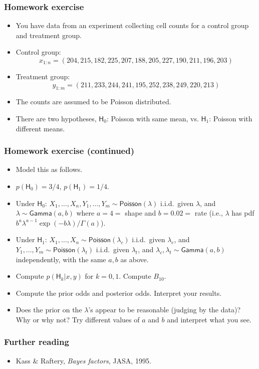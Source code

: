 \documentclass[handout]{beamer}
\def\H{\textsf{H}}
\begin{document}
\begin{frame}
\frametitle{Homework exercise}
\begin{itemize}
\item You have data from an experiment collecting cell counts for a control group and treatment group.
\item Control group:
$$ x_{1:n} = (204,  215, 182,  225,  207,   188,  205,  227,  190,  211, 196,  203) $$
\item Treatment group:
$$ y_{1:m} = (211, 233, 244,  241,  195,  252,  238,  249,  220,  213)$$
\item The counts are assumed to be Poisson distributed.  
\item There are two hypotheses, $\H_0$: Poisson with same mean, vs. $\H_1$: Poisson with different means.
\end{itemize}
\end{frame}


\begin{frame}
\frametitle{Homework exercise (continued)}
\begin{itemize}
\item Model this as follows.
\item $p(\H_0) = 3/4$, $p(\H_1) = 1/4$. 
\item Under $\H_0$: $X_1,\dotsc,X_n,Y_1,\dotsc,Y_m\sim \mathsf{Poisson}(\lambda)$ i.i.d.\ given $\lambda$, and $\lambda\sim\mathsf{Gamma}(a,b)$ where $a=4=$ shape and $b=0.02=$ rate (i.e., $\lambda$ has pdf $b^a\lambda^{a-1}\exp(-b\lambda)/\Gamma(a)$).
\item Under $\H_1$: $X_1,\dotsc,X_n\sim \mathsf{Poisson}(\lambda_c)$ i.i.d.\ given $\lambda_c$, and $Y_1,\dotsc,Y_m\sim \mathsf{Poisson}(\lambda_t)$ i.i.d.\ given $\lambda_t$, and $\lambda_c,\lambda_t\sim\mathsf{Gamma}(a,b)$ independently, with the same $a,b$ as above.
\item Compute $p(\H_k|x,y)$ for $k = 0,1$. Compute $B_{10}$. 
\item Compute the prior odds and posterior odds. Interpret your results.
\item Does the prior on the $\lambda$'s appear to be reasonable (judging by the data)?  Why or why not?  Try different values of $a$ and $b$ and interpret what you see.
\end{itemize}
\end{frame}







\begin{frame}
\frametitle{Further reading}
\begin{itemize}
\item Kass \& Raftery, \emph{Bayes factors}, JASA, 1995.
\end{itemize}
\end{frame}






 
\end{document}
